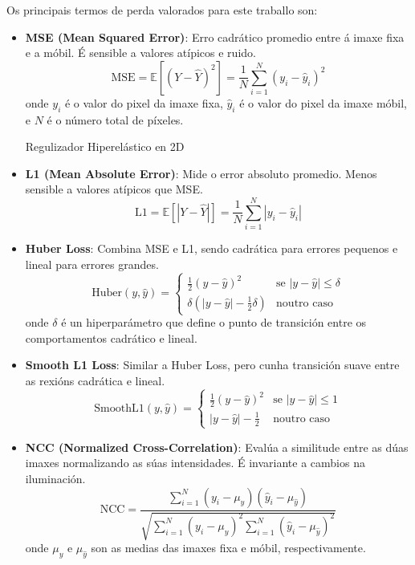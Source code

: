 Os principais termos de perda valorados para este traballo son:

\begin{itemize}
    \item \textbf{MSE (Mean Squared Error)}:
    Erro cadrático promedio entre á imaxe fixa e a móbil. É sensible a valores atípicos e ruido.
    \[
    \text{MSE} = \mathbb{E}[(Y - \hat{Y})^2] = \frac{1}{N} \sum_{i=1}^{N} (y_i - \hat{y}_i)^2
    \]
    onde \( y_i \) é o valor do pixel da imaxe fixa, \( \hat{y}_i \) é o valor do pixel da imaxe móbil, e \( N \) é o número total de píxeles. \cite{Palubinskas02012017}

    Regulizador Hiperelástico en 2D   \item \textbf{L1 (Mean Absolute Error)}:
    Mide o error absoluto promedio. Menos sensible a valores atípicos que MSE.
    \[
    \text{L1} = \mathbb{E}[|Y - \hat{Y}|] = \frac{1}{N} \sum_{i=1}^{N} |y_i - \hat{y}_i|
    \]

    \item \textbf{Huber Loss}:
    Combina MSE e L1, sendo cadrática para errores pequenos e lineal para errores grandes.
    \[
    \text{Huber}(y, \hat{y}) = \begin{cases}
    \frac{1}{2}(y - \hat{y})^2 & \text{se } |y - \hat{y}| \leq \delta \\
    \delta(|y - \hat{y}| - \frac{1}{2}\delta) & \text{noutro caso}
    \end{cases}
    \]
    onde \( \delta \) é un hiperparámetro que define o punto de transición entre os comportamentos cadrático e lineal.

    \item \textbf{Smooth L1 Loss}:
    Similar a Huber Loss, pero cunha transición suave entre as rexións cadrática e lineal.
    \[
    \text{SmoothL1}(y, \hat{y}) = \begin{cases}
    \frac{1}{2}(y - \hat{y})^2 & \text{se } |y - \hat{y}| \leq 1 \\
    |y - \hat{y}| - \frac{1}{2} & \text{noutro caso}
    \end{cases}
    \]

    \item \textbf{NCC (Normalized Cross-Correlation)}:
    Evalúa a similitude entre as dúas imaxes normalizando as súas intensidades. É invariante a cambios na iluminación.
    \[
    \text{NCC} = \frac{\sum_{i=1}^{N} (y_i - \mu_y)(\hat{y}_i - \mu_{\hat{y}})}{\sqrt{\sum_{i=1}^{N} (y_i - \mu_y)^2 \sum_{i=1}^{N} (\hat{y}_i - \mu_{\hat{y}})^2}}
    \]
    onde \( \mu_y \) e \( \mu_{\hat{y}} \) son as medias das imaxes fixa e móbil, respectivamente.


\end{itemize}
